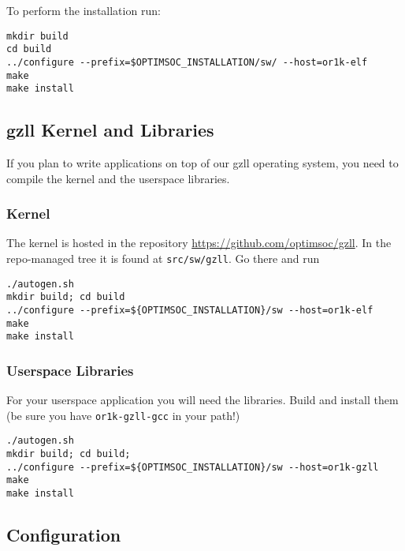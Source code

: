 


To perform the installation run:

\begin{lstlisting}
mkdir build
cd build
../configure --prefix=$OPTIMSOC_INSTALLATION/sw/ --host=or1k-elf
make
make install
\end{lstlisting}

\subsection{gzll Kernel and Libraries}

If you plan to write applications on top of our gzll operating system,
you need to compile the kernel and the userspace libraries.

\subsubsection{Kernel}

The kernel is hosted in the repository
\url{https://github.com/optimsoc/gzll}. In the repo-managed tree it is
found at \verb|src/sw/gzll|. Go there and run

\begin{lstlisting}
./autogen.sh
mkdir build; cd build
../configure --prefix=${OPTIMSOC_INSTALLATION}/sw --host=or1k-elf
make
make install
\end{lstlisting}

\subsubsection{Userspace Libraries}

For your userspace application you will need the libraries. Build and
install them (be sure you have \verb|or1k-gzll-gcc| in your path!)

\begin{lstlisting}
./autogen.sh
mkdir build; cd build;
../configure --prefix=${OPTIMSOC_INSTALLATION}/sw --host=or1k-gzll
make
make install
\end{lstlisting}

\subsection{Configuration}

